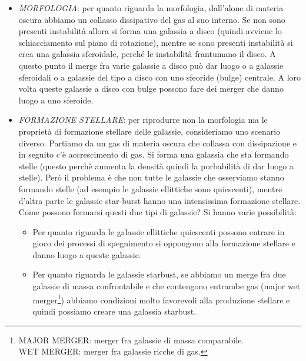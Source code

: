 \begin{itemize}
    \item \emph{MORFOLOGIA}: per quanto riguarda la morfologia, dall'alone di materia oscura abbiamo un collasso dissipativo del gas al suo interno. Se non sono presenti instabilità allora si forma una galassia a disco (quindi avviene lo schiacciamento sul piano di rotazione), mentre se sono presenti instabilità si crea una galassia sferoidale, perché le instabilità frantumano il disco. A questo punto il merge fra varie galassie a disco può dar luogo o a galassie sferoidali o a galassie del tipo a disco con uno sfeoride (bulge) centrale. A loro volta queste galassie a disco con bulge possono fare dei merger che danno luogo a uno sferoide.
    \item \emph{FORMAZIONE STELLARE}: per riprodurre non la morfologia ma le proprietà di formazione stellare delle galassie, consideriamo uno scenario diverso. Partiamo da un gas di materia oscura che collassa con dissipazione e in seguito c’è accrescimento di gas. Si forma una galassia che sta formando stelle (questo perchè aumenta la densità quindi la porbabilità di dar luogo a stelle). Però il problema è che non tutte le galassie che osserviamo stanno formando stelle (ad esempio le galassie ellittiche sono quiescenti), mentre d’altra parte le galassie star-burst hanno una intensissima formazione stellare. Come possono formarsi questi due tipi di galassie? Si hanno varie possibilità:
    \begin{itemize}
        \item Per quanto riguarda le galassie ellittiche quiescenti possono entrare in gioco dei processi di spegnimento si oppongono alla formazione stellare e danno luogo a queste galassie.
        \item Per quanto riguarda le galassie starbust, se abbiamo un merge fra due galassie di massa confrontabile e che contengono entrambe gas (major wet merger\footnote{
        MAJOR MERGER: merger fra galassie di massa comparabile. \\
        WET MERGER: merger fra galassie ricche di gas.
        }) abbiamo condizioni molto favorevoli alla produzione stellare e quindi possiamo creare una galassia starbust.
    \end{itemize}
\end{itemize}